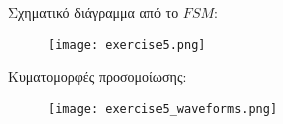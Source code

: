Σχηματικό διάγραμμα από το $FSM$:
\begin{figure}[H]
    \centering
    \texttt{[image: exercise5.png]}
\end{figure}

Κυματομορφές προσομοίωσης:
\begin{figure}[H]
    \centering
    \texttt{[image: exercise5\_waveforms.png]}
\end{figure}